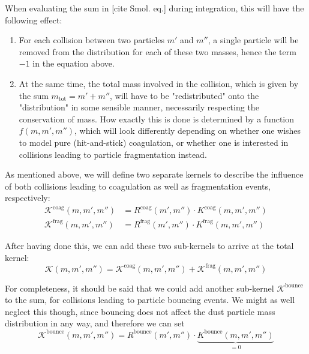     When evaluating the sum in [cite Smol. eq.] during integration, this will have the following 
    effect:
    \begin{enumerate}
        \item For each collision between two particles $m'$ and $m''$, a single particle will be 
            removed from the distribution for each of these two masses, hence the term $-1$ in the 
            equation above.
        \item At the same time, the total mass involved in the collision, which is given by the 
            sum $m_\text{tot} = m' + m''$, will have to be "redistributed" onto the "distribution" 
            in some sensible manner, necessarily respecting the conservation of mass. How exactly 
            this is done is determined by a function $f(m,m',m'')$, which will look differently 
            depending on whether one wishes to model pure (hit-and-stick) coagulation, or
            whether one is interested in collisions leading to particle fragmentation instead.
    \end{enumerate}

    As mentioned above, we will define two separate kernels to describe the influence of both
    collisions leading to coagulation as well as fragmentation events, respectively:
    \begin{align}
        \mathcal K^\text{coag}(m,m',m'') &= R^\text{coag}(m',m'') \cdot K^\text{coag}(m,m',m'') \\
        \mathcal K^\text{frag}(m,m',m'') &= R^\text{frag}(m',m'') \cdot K^\text{frag}(m,m',m'')
    \end{align}

    After having done this, we can add these two sub-kernels to arrive at the total kernel:
    \begin{equation}
        \mathcal K(m,m',m'') = \mathcal K^\text{coag}(m,m',m'') + \mathcal K^\text{frag}(m,m',m'')
    \end{equation}

    For completeness, it should be said that we could add another sub-kernel 
    $\mathcal K^\text{bounce}$ to the sum, for collisions leading to particle bouncing events.
    We might as well neglect this though, since bouncing does not affect the dust particle mass 
    distribution in any way, and therefore we can set
    \begin{equation}
        \mathcal K^\text{bounce}(m,m',m'') 
        = R^\text{bounce}(m',m'') \cdot \underbrace{K^\text{bounce}(m,m',m'')}_{=0}
    \end{equation}

